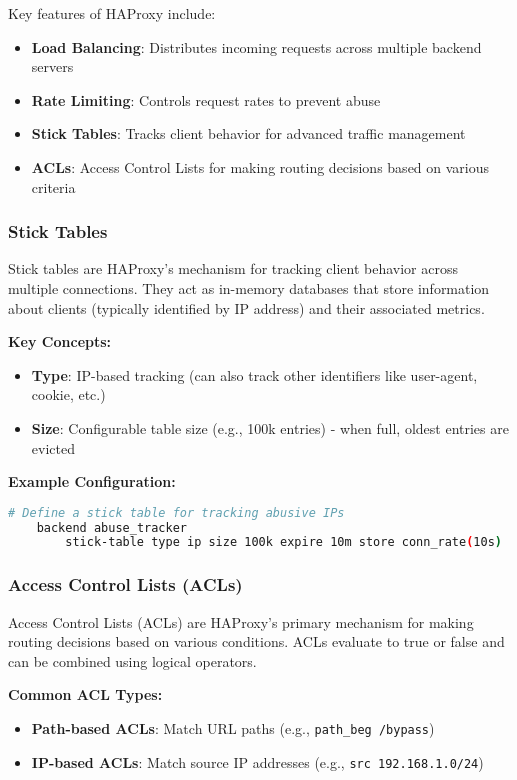 \documentclass[12pt]{article}
\begin{document}
    Key features of HAProxy include:
    \begin{itemize}
        \item \textbf{Load Balancing}: Distributes incoming requests across multiple backend servers
        \item \textbf{Rate Limiting}: Controls request rates to prevent abuse
        \item \textbf{Stick Tables}: Tracks client behavior for advanced traffic management
        \item \textbf{ACLs}: Access Control Lists for making routing decisions based on various criteria
    \end{itemize}

    \subsubsection{Stick Tables}
    Stick tables are HAProxy's mechanism for tracking client behavior across multiple connections. They act as in-memory databases that store information about clients (typically identified by IP address) and their associated metrics.

    \textbf{Key Concepts:}
    \begin{itemize}
        \item \textbf{Type}: IP-based tracking (can also track other identifiers like user-agent, cookie, etc.)
        \item \textbf{Size}: Configurable table size (e.g., 100k entries) - when full, oldest entries are evicted
    \end{itemize}

    \textbf{Example Configuration:}
    \begin{lstlisting}[language=bash]
    # Define a stick table for tracking abusive IPs
    backend abuse_tracker
        stick-table type ip size 100k expire 10m store conn_rate(10s)
    \end{lstlisting}

    \subsubsection{Access Control Lists (ACLs)}
    Access Control Lists (ACLs) are HAProxy's primary mechanism for making routing decisions based on various conditions. ACLs evaluate to true or false and can be combined using logical operators.

    \textbf{Common ACL Types:}
    \begin{itemize}
        \item \textbf{Path-based ACLs}: Match URL paths (e.g., \texttt{path\_beg /bypass})
        \item \textbf{IP-based ACLs}: Match source IP addresses (e.g., \texttt{src 192.168.1.0/24})

    \end{itemize}
\end{document}
